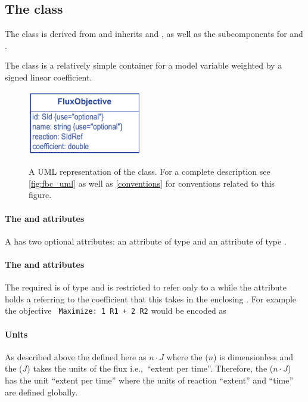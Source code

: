 \subsection{The \FBC {} class}
\label{fluxobjective-class}

The \FBC \FluxObjective class is derived from \SBML \SBase and inherits
 and , as well as the subcomponents for
\Annotation and \Notes.

The \FluxObjective class is a relatively simple container for a model
variable weighted by a signed linear coefficient.

%
\begin{figure}[ht]
  \centering
  \includegraphics[width=5cm]{images/v2harmony_fbc_fluxobjective.pdf}\\
  \caption{A UML representation of the \FBCPackage \FluxObjective class. For a complete description see \ref{fig:fbc_uml} as well as \ref{conventions} for conventions related to this figure.}
  \label{fig:fbc_uml_fobj}
\end{figure}

\paragraph{The  and  attributes}
A \FluxObjective has two optional attributes:  an attribute of
type  and  an attribute of type .

\paragraph{The  and  attributes}
The required  is of type  and is restricted
to refer only to a \Reaction while the  attribute
holds a  referring to the coefficient that this \FluxObjective
takes in the enclosing \Objective. For example the objective
\texttt{ Maximize: 1 R1 + 2 R2} would be encoded as
%

\paragraph{Units}
As described above the \FluxObjective defined here as $n\cdot J$ where
the  ($n$) is dimensionless and the  ($J$)
takes the units of the  flux i.e.,~``extent per time''.
Therefore, the \FluxObjective ($n\cdot J$)  has the unit ``extent per time''
where the units of reaction ``extent'' and ``time'' are defined globally.